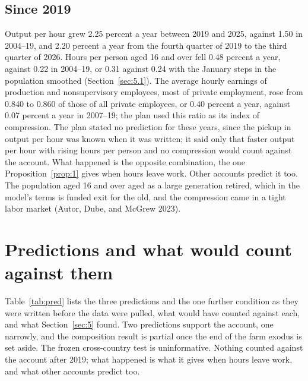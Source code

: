\documentclass[12pt]{article}
\theoremstyle{plain}
\begin{document}
\subsection{Since 2019}\label{sec:5.6}

Output per hour grew 2.25 percent a year between 2019 and 2025, against 1.50 in 2004--19, and 2.20 percent a year from the fourth quarter of 2019 to the third quarter of 2026. Hours per person aged 16 and over fell 0.48 percent a year, against 0.22 in 2004--19, or 0.31 against 0.24 with the January steps in the population smoothed (Section~\ref{sec:5.1}). The average hourly earnings of production and nonsupervisory employees, most of private employment, rose from 0.840 to 0.860 of those of all private employees, or 0.40 percent a year, against 0.07 percent a year in 2007--19; the plan used this ratio as its index of compression. The plan stated no prediction for these years, since the pickup in output per hour was known when it was written; it said only that faster output per hour with rising hours per person and no compression would count against the account. What happened is the opposite combination, the one Proposition~\ref{prop:1} gives when hours leave work. Other accounts predict it too. The population aged 16 and over aged as a large generation retired, which in the model's terms is funded exit for the old, and the compression came in a tight labor market (Autor, Dube, and McGrew 2023).

\section{Predictions and what would count against them}\label{sec:6}

Table~\ref{tab:pred} lists the three predictions and the one further condition as they were written before the data were pulled, what would have counted against each, and what Section~\ref{sec:5} found. Two predictions support the account, one narrowly, and the composition result is partial once the end of the farm exodus is set aside. The frozen cross-country test is uninformative. Nothing counted against the account after 2019; what happened is what it gives when hours leave work, and what other accounts predict too.
\end{document}

